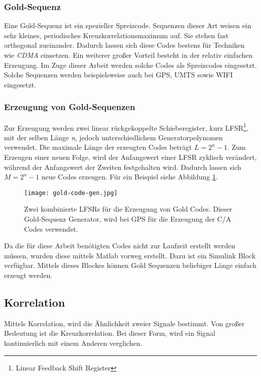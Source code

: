 \subsubsection{Gold-Sequenz}
Eine Gold-Sequenz ist ein spezieller Spreizcode. Sequenzen dieser Art weisen ein sehr kleines, periodisches Kreuzkorrelationsmaximum auf. Sie stehen fast orthogonal zueinander. Dadurch lassen sich diese Codes bestens für Techniken wie \emph{CDMA} einsetzen. Ein weiterer großer Vorteil besteht in der relativ einfachen Erzeugung. Im Zuge dieser Arbeit werden solche Codes als Spreizcodes eingesetzt. Solche Sequenzen werden beispielsweise auch bei GPS, UMTS sowie WIFI eingesetzt.

\subsubsection{Erzeugung von Gold-Sequenzen}
Zur Erzeugung werden zwei linear rückgekoppelte Schieberegister, kurz LFSR\footnote{Linear Feedback Shift Register}, mit der selben Länge \emph{n}, jedoch unterschiedlichem Generatorpolynomen verwendet. Die maximale Länge der erzeugten Codes beträgt  $ L = 2^{ n } -1 $. Zum Erzeugen einer neuen Folge, wird der Anfangswert einer LFSR zyklisch verändert, während der Anfangswert der Zweiten festgehalten wird. Dadurch lassen sich $ M = 2^{ n } -1 $ neue Codes erzeugen. Für ein Beispiel siehe Abbildung \ref{fig:GoldCode}.

\begin{figure}[H]
\centering
\texttt{[image: gold-code-gen.jpg]}
\caption{Zwei kombinierte LFSRs für die Erzeugung von Gold Codes. Dieser Gold-Sequenz Generator, wird bei GPS für die Erzeugung der C/A Codes verwendet. \cite{ImgGoldCode}}
\label{fig:GoldCode}
\end{figure}

Da die für diese Arbeit benötigten Codes nicht zur Laufzeit erstellt werden müssen, wurden diese mittels Matlab vorweg erstellt. Dazu ist ein Simulink Block verfügbar. Mittels dieses Blockes können Gold Sequenzen beliebiger Länge einfach erzeugt werden.

\subsection{Korrelation}
\label{cha:Korrelation}
Mittels Korrelation, wird die Ähnlichkeit zweier Signale bestimmt. Von großer Bedeutung ist die Kreuzkorrelation. Bei dieser Form, wird ein Signal kontinuierlich mit einem Anderen verglichen. 

